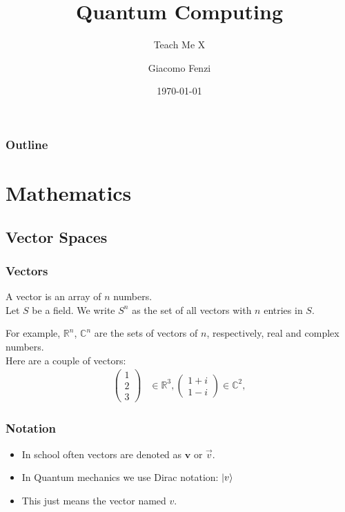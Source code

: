 \documentclass{beamer}
\title{Quantum Computing}
\subtitle{Teach Me X}
\author{Giacomo Fenzi}
\institute{University of St. Andrews}
\date{\today}
\begin{document}
\begin{frame}
    \titlepage
\end{frame}
\begin{frame}
    \frametitle{Outline}
    \tableofcontents
\end{frame}
\section{Mathematics}
\subsection{Vector Spaces}
\begin{frame}
    \frametitle{Vectors}
    A vector is an array of $n$ numbers. \\
    Let $S$ be a field. We write $S^n$ as the set of all vectors with $n$ entries in $S$.
    \begin{example}
        For example, $\mathbb{R}^n$, $\mathbb{C}^n$  are the sets of vectors of $n$, respectively, real and complex numbers. \\
        Here are a couple of vectors:
        \begin{align}
            \begin{pmatrix}
                1 \\
                2 \\
                3
            \end{pmatrix} & \in \mathbb{R}^3,
            \begin{pmatrix}
                1 + i \\
                1 - i
            \end{pmatrix} \in \mathbb{C}^2,
        \end{align}
    \end{example}
\end{frame}
\begin{frame}
    \frametitle{Notation}
    \begin{itemize}
        \item In school often vectors are denoted as $\boldsymbol{v}$ or $\vec{v}$.
        \item In Quantum mechanics we use Dirac notation: $\ket{v}$
        \item This just means the vector named $v$.
    \end{itemize}
\end{frame}
\end{document}
